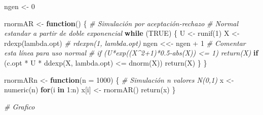 \documentclass[
]{book}
\newenvironment{Shaded}{\begin{snugshade}}{\end{snugshade}}
\newcommand{\AttributeTok}[1]{\textcolor[rgb]{0.77,0.63,0.00}{#1}}
\newcommand{\CommentTok}[1]{\textcolor[rgb]{0.56,0.35,0.01}{\textit{#1}}}
\newcommand{\ConstantTok}[1]{\textcolor[rgb]{0.00,0.00,0.00}{#1}}
\newcommand{\ControlFlowTok}[1]{\textcolor[rgb]{0.13,0.29,0.53}{\textbf{#1}}}
\newcommand{\DecValTok}[1]{\textcolor[rgb]{0.00,0.00,0.81}{#1}}
\newcommand{\FunctionTok}[1]{\textcolor[rgb]{0.00,0.00,0.00}{#1}}
\newcommand{\NormalTok}[1]{#1}
\newcommand{\OtherTok}[1]{\textcolor[rgb]{0.56,0.35,0.01}{#1}}
\newcommand{\SpecialCharTok}[1]{\textcolor[rgb]{0.00,0.00,0.00}{#1}}
\theoremstyle{break}
\theoremstyle{definition}
\theoremstyle{definition}
\theoremstyle{definition}
\theoremstyle{definition}
\theoremstyle{remark}
\begin{document}
\begin{Shaded}
\begin{Highlighting}[]
\NormalTok{ngen }\OtherTok{\textless{}{-}} \DecValTok{0}

\NormalTok{rnormAR }\OtherTok{\textless{}{-}} \ControlFlowTok{function}\NormalTok{() \{}
\CommentTok{\# Simulación por aceptación{-}rechazo}
\CommentTok{\# Normal estandar a partir de doble exponencial}
  \ControlFlowTok{while}\NormalTok{ (}\ConstantTok{TRUE}\NormalTok{) \{}
\NormalTok{    U }\OtherTok{\textless{}{-}} \FunctionTok{runif}\NormalTok{(}\DecValTok{1}\NormalTok{)}
\NormalTok{    X }\OtherTok{\textless{}{-}} \FunctionTok{rdexp}\NormalTok{(lambda.opt) }\CommentTok{\# rdexpn(1, lambda.opt)}
\NormalTok{    ngen }\OtherTok{\textless{}\textless{}{-}}\NormalTok{ ngen }\SpecialCharTok{+} \DecValTok{1} \CommentTok{\# Comentar esta línea para uso normal}
    \CommentTok{\# if (U*exp((X\^{}2+1)*0.5{-}abs(X)) \textless{}= 1) return(X)}
    \ControlFlowTok{if}\NormalTok{ (c.opt }\SpecialCharTok{*}\NormalTok{ U }\SpecialCharTok{*} \FunctionTok{ddexp}\NormalTok{(X, lambda.opt) }\SpecialCharTok{\textless{}=} \FunctionTok{dnorm}\NormalTok{(X)) }\FunctionTok{return}\NormalTok{(X)}
\NormalTok{  \}}
\NormalTok{\}}

\NormalTok{rnormARn }\OtherTok{\textless{}{-}} \ControlFlowTok{function}\NormalTok{(}\AttributeTok{n =} \DecValTok{1000}\NormalTok{) \{}
\CommentTok{\# Simulación n valores N(0,1)}
\NormalTok{    x }\OtherTok{\textless{}{-}} \FunctionTok{numeric}\NormalTok{(n)}
    \ControlFlowTok{for}\NormalTok{(i }\ControlFlowTok{in} \DecValTok{1}\SpecialCharTok{:}\NormalTok{n) x[i] }\OtherTok{\textless{}{-}} \FunctionTok{rnormAR}\NormalTok{()}
    \FunctionTok{return}\NormalTok{(x)}
\NormalTok{\}}

\CommentTok{\# Grafico}
\end{Highlighting}
\end{Shaded}
\end{document}
